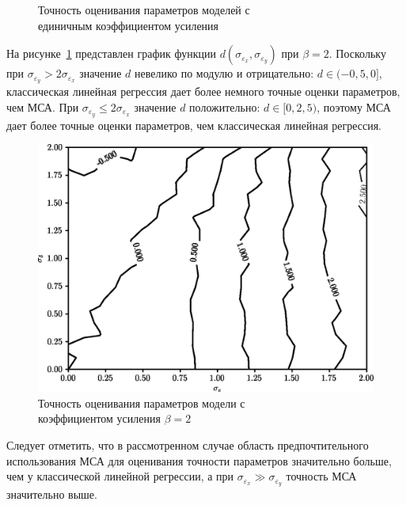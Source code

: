 \begin{figure}[p]
  \vspace{\baselineskip}
  \caption{Точность оценивания параметров моделей с \\ единичным коэффициентом усиления}
\end{figure}

\newpage
На рисунке~\ref{fig:comparison_linear_params_beta-2}
представлен график функции \( d(\sigma_{\varepsilon_x}, \sigma_{\varepsilon_y}) \)
при \( \beta = 2 \).
Поскольку при \( \sigma_{\varepsilon_y} > 2 \sigma_{\varepsilon_x} \)
значение \( d \) невелико по модулю и отрицательно: \( d \in ( -0{,}5, 0 ] \),
классическая линейная регрессия дает более немного точные оценки параметров, чем МСА.
При \( \sigma_{\varepsilon_y} \le 2\sigma_{\varepsilon_x} \)
значение \( d \) положительно: \( d \in [0, 2{,}5 ) \),
поэтому МСА дает более точные оценки параметров,
чем классическая линейная регрессия.

\begin{figure}[h]
  \centering
  \includegraphics[width=135mm]{fig/linear/param/beta-2_param.png}
  \caption{Точность оценивания параметров модели с \\ коэффициентом усиления \( \beta = 2 \)}\label{fig:comparison_linear_params_beta-2}
\end{figure}

Следует отметить, что в рассмотренном случае область предпочтительного использования
МСА для оценивания точности параметров значительно больше,
чем у классической линейной регрессии,
а при \( \sigma_{\varepsilon_x} \gg \sigma_{\varepsilon_y} \) точность МСА значительно выше.

